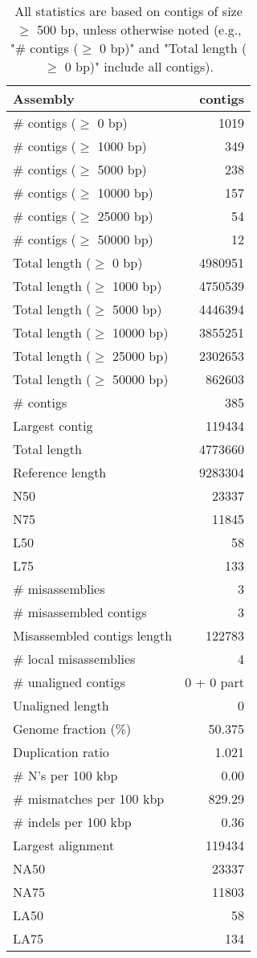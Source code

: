 \documentclass[12pt,a4paper]{article}
\begin{document}
\begin{table}[ht]
\begin{center}
\caption{All statistics are based on contigs of size $\geq$ 500 bp, unless otherwise noted (e.g., "\# contigs ($\geq$ 0 bp)" and "Total length ($\geq$ 0 bp)" include all contigs).}
\begin{tabular}{|l*{1}{|r}|}
\hline
Assembly & contigs \\ \hline
\# contigs ($\geq$ 0 bp) & 1019 \\ \hline
\# contigs ($\geq$ 1000 bp) & 349 \\ \hline
\# contigs ($\geq$ 5000 bp) & 238 \\ \hline
\# contigs ($\geq$ 10000 bp) & 157 \\ \hline
\# contigs ($\geq$ 25000 bp) & 54 \\ \hline
\# contigs ($\geq$ 50000 bp) & 12 \\ \hline
Total length ($\geq$ 0 bp) & 4980951 \\ \hline
Total length ($\geq$ 1000 bp) & 4750539 \\ \hline
Total length ($\geq$ 5000 bp) & 4446394 \\ \hline
Total length ($\geq$ 10000 bp) & 3855251 \\ \hline
Total length ($\geq$ 25000 bp) & 2302653 \\ \hline
Total length ($\geq$ 50000 bp) & 862603 \\ \hline
\# contigs & 385 \\ \hline
Largest contig & 119434 \\ \hline
Total length & 4773660 \\ \hline
Reference length & 9283304 \\ \hline
N50 & 23337 \\ \hline
N75 & 11845 \\ \hline
L50 & 58 \\ \hline
L75 & 133 \\ \hline
\# misassemblies & 3 \\ \hline
\# misassembled contigs & 3 \\ \hline
Misassembled contigs length & 122783 \\ \hline
\# local misassemblies & 4 \\ \hline
\# unaligned contigs & 0 + 0 part \\ \hline
Unaligned length & 0 \\ \hline
Genome fraction (\%) & 50.375 \\ \hline
Duplication ratio & 1.021 \\ \hline
\# N's per 100 kbp & 0.00 \\ \hline
\# mismatches per 100 kbp & 829.29 \\ \hline
\# indels per 100 kbp & 0.36 \\ \hline
Largest alignment & 119434 \\ \hline
NA50 & 23337 \\ \hline
NA75 & 11803 \\ \hline
LA50 & 58 \\ \hline
LA75 & 134 \\ \hline
\end{tabular}
\end{center}
\end{table}
\end{document}
